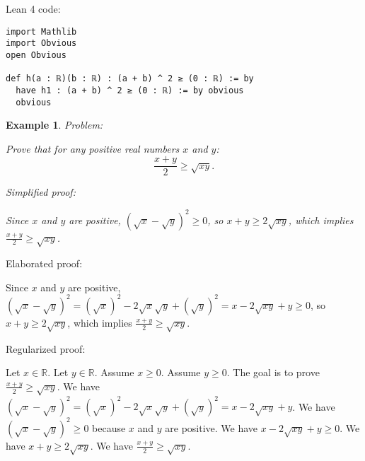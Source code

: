 \documentclass{article}
\newtheorem{example}{Example}
\begin{document}
Lean 4 code:
\begin{tcolorbox}[colback=white!10, width=\linewidth]
\begin{lstlisting}[language=Lean4]
import Mathlib
import Obvious
open Obvious

def h(a : ℝ)(b : ℝ) : (a + b) ^ 2 ≥ (0 : ℝ) := by
  have h1 : (a + b) ^ 2 ≥ (0 : ℝ) := by obvious
  obvious

\end{lstlisting}
\end{tcolorbox}


\begin{example}
Problem:
\begin{tcolorbox}[colback=yellow!10, width=\linewidth]
Prove that for any positive real numbers $x$ and $y$:
    $$\frac{x+y}{2} \geq \sqrt{xy}.$$
\end{tcolorbox}

Simplified proof:
\begin{tcolorbox}[colback=blue!10, width=\linewidth]
Since $x$ and $y$ are positive, $(\sqrt x - \sqrt y)^2 \ge 0$, so $x+y \ge 2\sqrt{xy}$, which implies $\frac{x+y}{2} \ge \sqrt{xy}$.
\end{tcolorbox}
\end{example}

Elaborated proof:
\begin{tcolorbox}[colback=green!10, width=\linewidth]
Since $x$ and $y$ are positive, $(\sqrt x - \sqrt y)^2 = (\sqrt{x})^2 - 2\sqrt{x}\sqrt{y} + (\sqrt{y})^2= x - 2\sqrt{xy} + y \ge 0$, so $x+y \ge 2\sqrt{xy}$, which implies $\frac{x+y}{2} \ge \sqrt{xy}$.
\end{tcolorbox}

Regularized proof:
\begin{tcolorbox}[colback=red!10, width=\linewidth]
Let $x\in\mathbb{R}$. Let $y\in\mathbb{R}$.
Assume $x \ge 0$. Assume $y \ge 0$.
The goal is to prove $\frac{x+y}{2} \ge \sqrt{xy}$.
We have ${{(\sqrt x - \sqrt y)}}^2 = {{(\sqrt{x})}}^2 - 2\sqrt{x}\sqrt{y} + {{(\sqrt{y})}}^2= x - 2\sqrt{xy} + y$.
We have ${{(\sqrt x - \sqrt y)}}^2 \ge 0$ because $x$ and $y$ are positive.
We have $x - 2\sqrt{xy} + y \ge 0$.
We have $x+y \ge 2\sqrt{xy}$.
We have $\frac{x+y}{2} \ge \sqrt{xy}$.
\end{tcolorbox}
\end{document}
